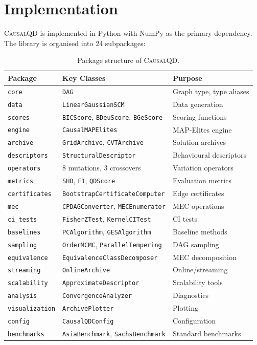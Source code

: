 \documentclass[11pt,a4paper]{article}
\begin{document}
\section{Implementation}
\label{sec:implementation}

\textsc{CausalQD} is implemented in Python with NumPy as the primary dependency. The library is organised into 24 subpackages:

\begin{table}[t]
\centering
\caption{Package structure of \textsc{CausalQD}.}
\label{tab:packages}
\begin{tabular}{@{}lll@{}}
\toprule
\textbf{Package} & \textbf{Key Classes} & \textbf{Purpose} \\
\midrule
\texttt{core} & \texttt{DAG} & Graph type, type aliases \\
\texttt{data} & \texttt{LinearGaussianSCM} & Data generation \\
\texttt{scores} & \texttt{BICScore}, \texttt{BDeuScore}, \texttt{BGeScore} & Scoring functions \\
\texttt{engine} & \texttt{CausalMAPElites} & MAP-Elites engine \\
\texttt{archive} & \texttt{GridArchive}, \texttt{CVTArchive} & Solution archives \\
\texttt{descriptors} & \texttt{StructuralDescriptor} & Behavioural descriptors \\
\texttt{operators} & 8 mutations, 3 crossovers & Variation operators \\
\texttt{metrics} & \texttt{SHD}, \texttt{F1}, \texttt{QDScore} & Evaluation metrics \\
\texttt{certificates} & \texttt{BootstrapCertificateComputer} & Edge certificates \\
\texttt{mec} & \texttt{CPDAGConverter}, \texttt{MECEnumerator} & MEC operations \\
\texttt{ci\_tests} & \texttt{FisherZTest}, \texttt{KernelCITest} & CI tests \\
\texttt{baselines} & \texttt{PCAlgorithm}, \texttt{GESAlgorithm} & Baseline methods \\
\texttt{sampling} & \texttt{OrderMCMC}, \texttt{ParallelTempering} & DAG sampling \\
\texttt{equivalence} & \texttt{EquivalenceClassDecomposer} & MEC decomposition \\
\texttt{streaming} & \texttt{OnlineArchive} & Online/streaming \\
\texttt{scalability} & \texttt{ApproximateDescriptor} & Scalability tools \\
\texttt{analysis} & \texttt{ConvergenceAnalyzer} & Diagnostics \\
\texttt{visualization} & \texttt{ArchivePlotter} & Plotting \\
\texttt{config} & \texttt{CausalQDConfig} & Configuration \\
\texttt{benchmarks} & \texttt{AsiaBenchmark}, \texttt{SachsBenchmark} & Standard benchmarks \\
\bottomrule
\end{tabular}
\end{table}
\end{document}
